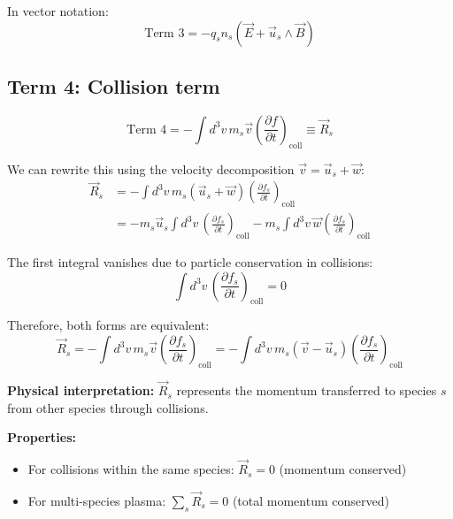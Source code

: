 In vector notation:
\begin{equation*}
\text{Term 3} = -q_s n_s (\vec{E} + \vec{u}_s \wedge \vec{B})
\end{equation*}

\subsection{Term 4: Collision term}

\begin{equation*}
\text{Term 4} = -\int d^3v \, m_s \vec{v} \left(\frac{\partial f}{\partial t}\right)_{\text{coll}} \equiv \vec{R}_s
\end{equation*}

We can rewrite this using the velocity decomposition $\vec{v} = \vec{u}_s + \vec{w}$:
\begin{align*}
\vec{R}_s &= -\int d^3v \, m_s (\vec{u}_s + \vec{w}) \left(\frac{\partial f_s}{\partial t}\right)_{\text{coll}}  \\
&= -m_s \vec{u}_s \int d^3v \, \left(\frac{\partial f_s}{\partial t}\right)_{\text{coll}} - m_s \int d^3v \, \vec{w} \left(\frac{\partial f_s}{\partial t}\right)_{\text{coll}}
\end{align*}

The first integral vanishes due to particle conservation in collisions:
\begin{equation*}
\int d^3v \, \left(\frac{\partial f_s}{\partial t}\right)_{\text{coll}} = 0
\end{equation*}

Therefore, both forms are equivalent:
\begin{equation*}
 \vec{R}_s = -\int d^3v \, m_s \vec{v} \left(\frac{\partial f_s}{\partial t}\right)_{\text{coll}} = -\int d^3v \, m_s (\vec{v} - \vec{u}_s) \left(\frac{\partial f_s}{\partial t}\right)_{\text{coll}}
\end{equation*}

\textbf{Physical interpretation:} $\vec{R}_s$ represents the momentum transferred to species $s$ from other species through collisions.

\textbf{Properties:}
\begin{itemize}
\item For collisions within the same species: $\vec{R}_s = 0$ (momentum conserved)
\item For multi-species plasma: $\sum_s \vec{R}_s = 0$ (total momentum conserved)
\end{itemize}

